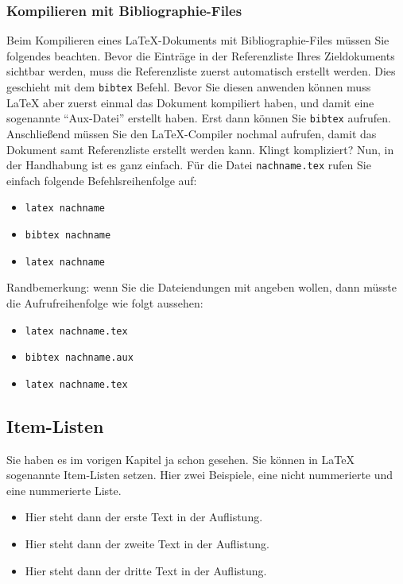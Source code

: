 \documentclass[a4paper,twoside]{IEEEtran}
\begin{document}
\subsubsection{Kompilieren mit Bibliographie-Files}

Beim Kompilieren eines LaTeX-Dokuments mit Bibliographie-Files müssen Sie folgendes beachten. Bevor die Einträge in der Referenzliste Ihres Zieldokuments sichtbar werden, muss die Referenzliste zuerst automatisch erstellt werden. Dies geschieht mit dem \texttt{bibtex} Befehl. Bevor Sie diesen anwenden können muss LaTeX aber zuerst einmal das Dokument kompiliert haben, und damit eine sogenannte "`Aux-Datei"' erstellt haben. Erst dann können Sie \texttt{bibtex} aufrufen. Anschließend müssen Sie den LaTeX-Compiler nochmal aufrufen, damit das Dokument samt Referenzliste erstellt werden kann. Klingt kompliziert? Nun, in der Handhabung ist es ganz einfach. Für die Datei \texttt{nachname.tex} rufen Sie einfach folgende Befehlsreihenfolge auf:

\begin{itemize}
\item \texttt{latex nachname}
\item \texttt{bibtex nachname}
\item \texttt{latex nachname}
\end{itemize}

Randbemerkung: wenn Sie die Dateiendungen mit angeben wollen, dann müsste die Aufrufreihenfolge wie folgt aussehen:

\begin{itemize}
\item \texttt{latex nachname.tex}
\item \texttt{bibtex nachname.aux}
\item \texttt{latex nachname.tex}
\end{itemize}
 

\subsection{Item-Listen}

Sie haben es im vorigen Kapitel ja schon gesehen. Sie können in LaTeX sogenannte Item-Listen setzen. Hier zwei Beispiele, eine nicht nummerierte und eine nummerierte Liste.

 \begin{itemize}
\item Hier steht dann der erste Text in der Auflistung.
\item Hier steht dann der zweite Text in der Auflistung.
\item Hier steht dann der dritte Text in der Auflistung.
\end{itemize}
\end{document}
